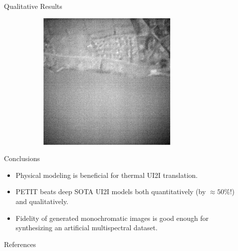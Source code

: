 \documentclass[final]{beamer}
\newlength{\sepwidth}
\newlength{\colwidth}
\newcommand{\separatorcolumn}{\begin{column}{\sepwidth}\end{column}}
\begin{document}
\begin{frame}[t]
\begin{columns}[t]
\begin{column}{\colwidth}
\begin{block}{Qualitative Results}
\begin{figure}
\begin{subfigure}[b]{0.19\textwidth}
            \label{fig:petit}
        \end{subfigure}
        \hfill
        \begin{subfigure}[b]{0.19\textwidth}
            \centering
            \includegraphics[width=\textwidth]{../figs/outputs/mono/994.png}
            \label{fig:mono}
        \end{subfigure}
      \end{figure}
  \end{block}

  \begin{block}{Conclusions}
    \begin{itemize}
      \item Physical modeling is beneficial for thermal UI2I translation. 
      \item PETIT beats deep SOTA UI2I models both quantitatively (by $\approx 50\%$!) and qualitatively.
      \item Fidelity of generated monochromatic images is good enough for synthesizing an artificial multispectral dataset.
    \end{itemize}      
  \end{block}

  \begin{block}{References}

    \footnotesize{}

  \end{block}

\end{column}

\separatorcolumn
\end{columns}
\end{frame}
\end{document}

